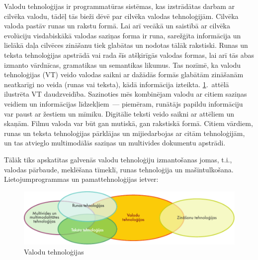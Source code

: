\clearpage



\begin{multicols}{2}

Valodu tehnoloģijas ir programmatūras sistēmas, kas izstrādātas darbam ar cilvēka valodu, tādēļ tās bieži dēvē par cilvēka valodas tehnoloģijām.
Cilvēka valoda pastāv runas un rakstu formā.
Lai arī vecākā un saistībā ar cilvēka evolūciju visdabiskākā valodas saziņas forma ir runa, sarežģīta informācija un lielākā daļa cilvēces zināšanu tiek glabātas un nodotas tālāk rakstiski.
Runas un teksta tehnoloģijas apstrādā vai rada šīs atšķirīgās valodas formas, lai arī tās abas izmanto vārdnīcas,  gramatikas un semantikas likumus.
Tas nozīmē, ka valodu tehnoloģijas (VT) veido valodas saikni ar dažādās formās glabātām zināšanām neatkarīgi no veida (runas vai teksta), kādā informācija izteikta.
\ref{fig:ltincontext_de}.~attēlā ilustrēta VT daudzveidība.
Sazinoties mēs kombinējam valodu ar citiem saziņas veidiem un informācijas līdzekļiem~--- piemēram, runātājs papildu informāciju var paust ar žestiem un mīmiku.
Digitālie teksti veido saikni ar attēliem un skaņām.
Filmu valoda var būt gan mutiskā, gan rakstiskā formā.
Citiem vārdiem, runas un teksta tehnoloģijas pārklājas un mijiedarbojas ar citām tehnoloģijām, un tas atvieglo multimodālās saziņas un multivides dokumentu apstrādi. 

Tālāk tiks apskatītas galvenās valodu tehnoloģiju izmantošanas jomas, t.i., valodas pārbaude, meklēšana tīmeklī, runas tehnoloģija un mašīntulkošana.
Lietojumprogrammas un pamattehnoloģijas ietver: 

\begin{figure}[htb]
  \center
  \includegraphics[width=\textwidth]{../_media/latvian/language_technologies}
  \caption{Valodu tehnoloģijas}
  \label{fig:ltincontext_de}
\end{figure}


\end{multicols}

